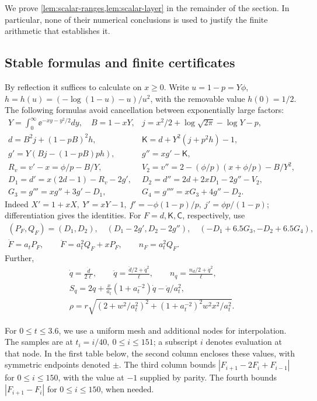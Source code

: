 We prove \cref{lem:scalar-ranges,lem:scalar-layer} in the remainder of the section. In particular, none of their numerical conclusions is used to justify the finite arithmetic that establishes it.

\subsection{Stable formulas and finite certificates}

By reflection it suffices to calculate on $x\ge0$. Write $u=1-p=Y\phi$, $h=h(u)=(-\log(1-u)-u)/u^2$, with the removable value $h(0)=1/2$. The following formulas avoid cancellation between exponentially large factors:
\[
\begin{array}{ll}
 Y=\displaystyle\int_0^\infty \ee^{-xy-y^2/2}dy,\quad B=1-xY,& j=x^2/2+\log\sqrt{2\pi}-\log Y-p,\\
 d=B^2 j+(1-pB)^2 h,& \mathsf K=d+Y^2(j+p^2h)-1,\\
 g'=Y(Bj-(1-pB)p h),& g''=xg'-\mathsf K,\\
 R_v=v'-x=\phi/p-B/Y,& V_2=v''=2-(\phi/p)(x+\phi/p)-B/Y^2,\\
 D_1=d'=x(2d-1)-R_v-2g',&D_2=d''=2d+2xD_1-2g''-V_2,\\
 G_3=g'''=xg''+3g'-D_1,&G_4=g''''=xG_3+4g''-D_2 .
\end{array}
\]
Indeed $X'=1+xX,\ Y'=xY-1,\ f'=-\phi(1-p)/p,\ j'=\phi p/(1-p)$; differentiation gives the identities. For $F=d,\mathsf K,\mathsf C$, respectively, use
\[
\begin{gathered}
 (P_F,Q_F)=(D_1,D_2),\quad (D_1-2g',D_2-2g''),\quad
 (-D_1+6.5G_3,-D_2+6.5G_4),\\
 \dot F=a_t P_F,\qquad \ddot F=a_t^2 Q_F+xP_F,\qquad n_F=a_t^2 Q_F.
\end{gathered}
\]
Further,
\[
\begin{gathered}
 \dot q=\frac{\dot d}{2\ell},\qquad
 \ddot q=\frac{\ddot d/2+\dot q^2}{\ell},\qquad
 n_q=\frac{n_d/2+\dot q^2}{\ell},\\
 S_q=2q+\frac{x}{a_t}(1+a_t^{-2})\dot q-\ddot q/a_t^2,\\
 \rho=r\sqrt{(2+w^2/a_t^2)^2+(1+a_t^{-2})^2w^2x^2/a_t^2}.
\end{gathered}
\]

For $0\le t\le3.6$, we use a uniform mesh and additional nodes for interpolation. The samples are at $t_i=i/40,\ 0\le i\le151$; a subscript $i$ denotes evaluation at that node. In the first table below, the second column encloses these values, with symmetric endpoints denoted $\pm$. The third column bounds $|F_{i+1}-2F_i+F_{i-1}|$ for $0\le i\le150$, with the value at $-1$ supplied by parity. The fourth bounds $|F_{i+1}-F_i|$ for $0\le i\le150$, when needed.

